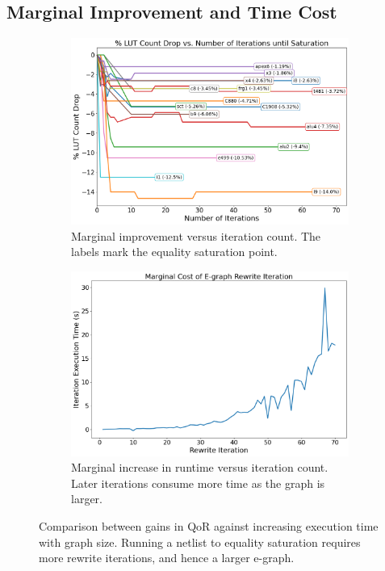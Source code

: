 \subsection{Marginal Improvement and Time Cost}\label{sec:results:margin}
\begin{figure}
    \begin{subfigure}{0.47\textwidth}
        \centering
        \includegraphics[width=\textwidth]{img/improvement.png}
        \caption{Marginal improvement versus iteration count. The labels mark the equality saturation point.}\label{fig:marginal:improvement}
        \Description[]{}
    \end{subfigure}
    \hfill\vspace{4mm}
    \begin{subfigure}{0.47\textwidth}
        \centering
        \includegraphics[width=\textwidth]{img/runtime_derivative.png}
        \caption{Marginal increase in runtime versus iteration count. Later iterations consume more time as the graph is larger.}\label{fig:marginal:runtime}
        \Description[]{}
    \end{subfigure}
    \caption{Comparison between gains in QoR against increasing execution time with graph size. Running a netlist to equality saturation requires more rewrite iterations, and hence a larger e-graph.}\label{fig:marginal}
    \Description[]{}
\end{figure}

